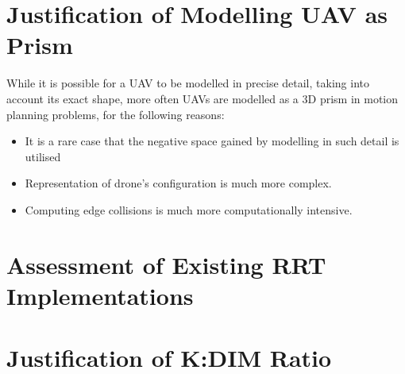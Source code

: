
\section{Justification of Modelling UAV as Prism}
\label{section:rrt_appendix_modelling}
    While it is possible for a \gls{UAV} to be modelled in precise detail, taking into account its exact shape, more often \glspl{UAV} are modelled as a 3D prism in motion planning problems, for the following reasons:
    \begin{itemize}
    \item It is a rare case that the negative space gained by modelling in such detail is utilised
    \item Representation of drone's configuration is much more complex.
    \item Computing edge collisions is much more computationally intensive.
    \end{itemize}

    

\section{Assessment of Existing RRT Implementations}
\label{section:rrt_appendix_existing_implementations}
    

\section{Justification of K:DIM Ratio}